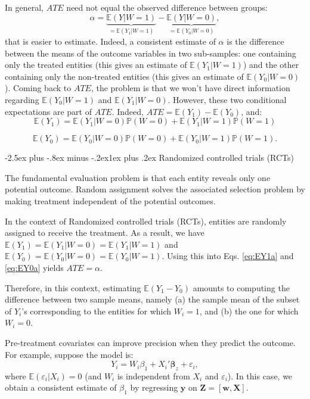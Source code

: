 \documentclass[
  11pt,
]{book}
\makeatletter
\renewcommand\subsection{\@startsection{subsection}{2}{\z@}
  {-2.5ex plus -.8ex minus -.2ex}{1ex plus .2ex}
  {\normalfont\large\bfseries\color{TextbookInk}}}
\theoremstyle{definition}
\theoremstyle{definition}
\theoremstyle{definition}
\theoremstyle{definition}
\theoremstyle{remark}
\makeatother
\begin{document}
In general, \(ATE\) need not equal the observed difference between groups:
\[
\alpha = \underbrace{\mathbb{E}(Y|W=1)}_{=\mathbb{E}(Y_1|W=1)} - \underbrace{\mathbb{E}(Y|W=0)}_{=\mathbb{E}(Y_0|W=0)},
\]
that is easier to estimate. Indeed, a consistent estimate of \(\alpha\) is the difference between the means of the outcome variables in two sub-samples: one containing only the treated entities (this gives an estimate of \(\mathbb{E}(Y_1|W=1)\)) and the other containing only the non-treated entities (this gives an estimate of \(\mathbb{E}(Y_0|W=0)\)). Coming back to \(ATE\), the problem is that we won't have direct information regarding \(\mathbb{E}(Y_0|W=1)\) and \(\mathbb{E}(Y_1|W=0)\). However, these two conditional expectations are part of \(ATE\). Indeed, \(ATE = \mathbb{E}(Y_1) - \mathbb{E}(Y_0)\), and:
\begin{equation}
\mathbb{E}(Y_1) = \mathbb{E}(Y_1|W=0)\mathbb{P}(W=0)+\mathbb{E}(Y_1|W=1)\mathbb{P}(W=1) \label{eq:EY1a}
\end{equation}

\begin{equation}
\mathbb{E}(Y_0) = \mathbb{E}(Y_0|W=0)\mathbb{P}(W=0)+\mathbb{E}(Y_0|W=1)\mathbb{P}(W=1). \label{eq:EY0a}
\end{equation}

\subsection{Randomized controlled trials (RCTs)}\label{randomized-controlled-trials-rcts}

The fundamental evaluation problem is that each entity reveals only one potential outcome. Random assignment solves the associated selection problem by making treatment independent of the potential outcomes.

In the context of Randomized controlled trials (RCTs), entities are randomly assigned to receive the treatment. As a result, we have \(\mathbb{E}(Y_1) = \mathbb{E}(Y_1|W=0) = \mathbb{E}(Y_1|W=1)\) and \(\mathbb{E}(Y_0) = \mathbb{E}(Y_0|W=0) = \mathbb{E}(Y_0|W=1)\). Using this into Eqs. \eqref{eq:EY1a} and \eqref{eq:EY0a} yields \(ATE = \alpha\).

Therefore, in this context, estimating \(\mathbb{E}(Y_1-Y_0)\) amounts to computing the difference between two sample means, namely (a) the sample mean of the subset of \(Y_i\)'s corresponding to the entities for which \(W_i=1\), and (b) the one for which \(W_i=0\).

Pre-treatment covariates can improve precision when they predict the outcome. For example, suppose the model is:
\[
Y_{i} = W_{i} \beta_{1} + X_i'\boldsymbol\beta_z + \varepsilon_i,
\]
where \(\mathbb{E}(\varepsilon_i|X_i) = 0\) (and \(W_i\) is independent from \(X_i\) and \(\varepsilon_i\)). In this case, we obtain a consistent estimate of \(\beta_1\) by regressing \(\mathbf{y}\) on \(\mathbf{Z} = [\mathbf{w},\mathbf{X}]\).
\end{document}
